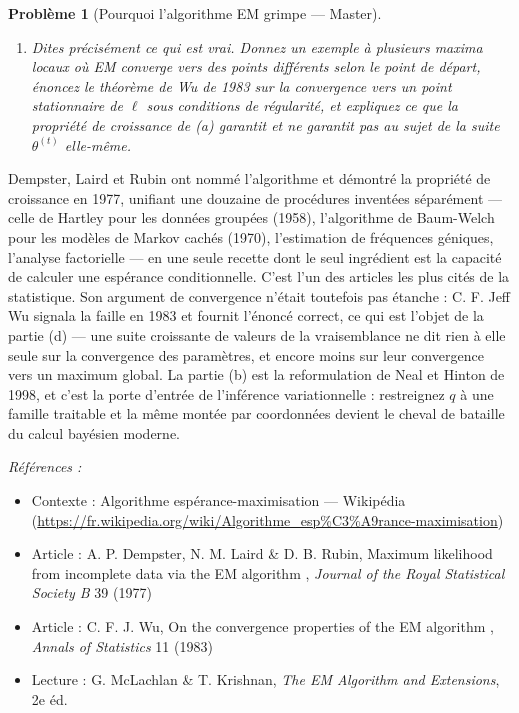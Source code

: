 \documentclass[11pt]{article}
\newtheorem{problem}{Problème}
\newenvironment{refs}{\par\small\noindent\emph{Références :}\begin{itemize}\setlength\itemsep{0pt}}{\end{itemize}\normalsize}
\begin{document}
\begin{problem}[{Pourquoi l'algorithme EM grimpe --- Master}]
\begin{enumerate}
vraisemblance n'est pas bornée --- envoyez l'espérance d'une composante sur un point de données et sa
variance vers zéro --- de sorte que \og{} EM converge vers l'estimateur du maximum de vraisemblance \fg{} ne
peut pas être vrai tel quel.
\item[(d)] Dites précisément ce qui est vrai. Donnez un exemple à plusieurs maxima locaux où EM converge
vers des points différents selon le point de départ, énoncez le théorème de Wu de 1983 sur la
convergence vers un point stationnaire de $ \ell $ sous conditions de régularité, et expliquez ce
que la propriété de croissance de (a) garantit et ne garantit pas au sujet de la suite
$ \theta^{(t)} $ elle-même.
\end{enumerate}

\end{problem}

\noindent Dempster, Laird et Rubin ont nommé l'algorithme et démontré la propriété de
croissance en 1977, unifiant une douzaine de procédures inventées séparément --- celle de Hartley
pour les données groupées (1958), l'algorithme de Baum-Welch pour les modèles de Markov cachés
(1970), l'estimation de fréquences géniques, l'analyse factorielle --- en une seule recette dont le
seul ingrédient est la capacité de calculer une espérance conditionnelle. C'est l'un des articles
les plus cités de la statistique. Son argument de convergence n'était toutefois pas étanche :
C. F. Jeff Wu signala la faille en 1983 et fournit l'énoncé correct, ce qui est l'objet de la partie
(d) --- une suite croissante de valeurs de la vraisemblance ne dit rien à elle seule sur la
convergence des paramètres, et encore moins sur leur convergence vers un maximum global. La partie
(b) est la reformulation de Neal et Hinton de 1998, et c'est la porte d'entrée de l'inférence
variationnelle : restreignez $ q $ à une famille traitable et la même montée par coordonnées
devient le cheval de bataille du calcul bayésien moderne.

\begin{refs}
\item Contexte : Algorithme espérance-maximisation --- Wikipédia (\url{https://fr.wikipedia.org/wiki/Algorithme_esp%C3%A9rance-maximisation})
\item Article : A. P. Dempster, N. M. Laird \& D. B. Rubin, \og{} Maximum likelihood from incomplete data via the EM algorithm \fg{}, \textit{Journal of the Royal Statistical Society B} 39 (1977)
\item Article : C. F. J. Wu, \og{} On the convergence properties of the EM algorithm \fg{}, \textit{Annals of Statistics} 11 (1983)
\item Lecture : G. McLachlan \& T. Krishnan, \textit{The EM Algorithm and Extensions}, 2e éd.
\end{refs}
\end{document}
